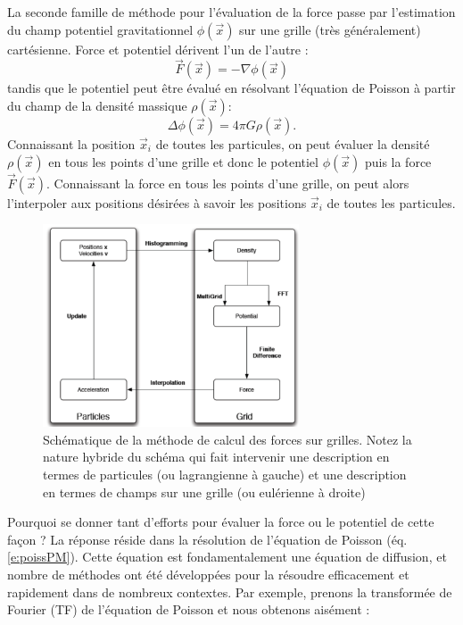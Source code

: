 La seconde famille de méthode pour l'évaluation de la force passe par l'estimation du champ potentiel gravitationnel $\phi(\vec x)$ sur une grille (très généralement) cartésienne. Force et potentiel dérivent l'un de l'autre :
\begin{equation}
\vec F (\vec x) =-\nabla \phi(\vec x)
\end{equation}
tandis que le potentiel peut être évalué en résolvant l'équation de Poisson à partir du champ de la densité massique $\rho(\vec x)$:
\begin{equation}
\Delta \phi(\vec x) = 4\pi G \rho(\vec x).
\label{e:poissPM}
\end{equation}
Connaissant la position $\vec x_i$ de toutes les particules, on peut évaluer la densité  $\rho(\vec x)$ en tous les points d'une grille et donc le potentiel $\phi(\vec x)$ puis la force $\vec F(\vec x)$. Connaissant la force en tous les points d'une grille, on peut alors l'interpoler aux positions désirées à savoir les positions $\vec x_i$ de toutes les particules.
\begin{figure}[htbp]
	\centering
		\includegraphics[height=6cm]{figs/PM.png}
	\caption[Schématique de la méthode de calcul des forces sur grilles.]{Schématique de la méthode de calcul des forces sur grilles. Notez la nature hybride du schéma qui fait intervenir une description en termes de particules (ou lagrangienne à gauche) et une description en termes de champs sur une grille (ou eulérienne à droite)}
	\label{f:PM}
\end{figure}
Pourquoi se donner tant d'efforts pour évaluer la force ou le potentiel de cette façon ? La réponse réside dans la résolution de l'équation de Poisson (éq. \ref{e:poissPM}). Cette équation est fondamentalement une équation de diffusion, et nombre de méthodes ont été développées pour la résoudre efficacement et rapidement dans de nombreux contextes. Par exemple, prenons la transformée de Fourier (TF) de l'équation de Poisson et nous obtenons aisément : 
